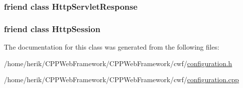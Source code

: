 \hypertarget{class_c_w_f_1_1_configuration_a84765570a5386c96f10067fb0e11bc13}{
\subsubsection[{Http\+Servlet\+Response}]{\setlength{\rightskip}{0pt plus 5cm}friend class {\bf Http\+Servlet\+Response}\hspace{0.3cm}{\ttfamily [friend]}}}\label{class_c_w_f_1_1_configuration_a84765570a5386c96f10067fb0e11bc13}
\hypertarget{class_c_w_f_1_1_configuration_a3e611175a551b64dda26f513067e0d04}{
\subsubsection[{Http\+Session}]{\setlength{\rightskip}{0pt plus 5cm}friend class {\bf Http\+Session}\hspace{0.3cm}{\ttfamily [friend]}}}\label{class_c_w_f_1_1_configuration_a3e611175a551b64dda26f513067e0d04}


The documentation for this class was generated from the following files\+:\begin{DoxyCompactItemize}
\item 
/home/herik/\+C\+P\+P\+Web\+Framework/\+C\+P\+P\+Web\+Framework/cwf/\hyperlink{configuration_8h}{configuration.\+h}\item 
/home/herik/\+C\+P\+P\+Web\+Framework/\+C\+P\+P\+Web\+Framework/cwf/\hyperlink{configuration_8cpp}{configuration.\+cpp}\end{DoxyCompactItemize}
